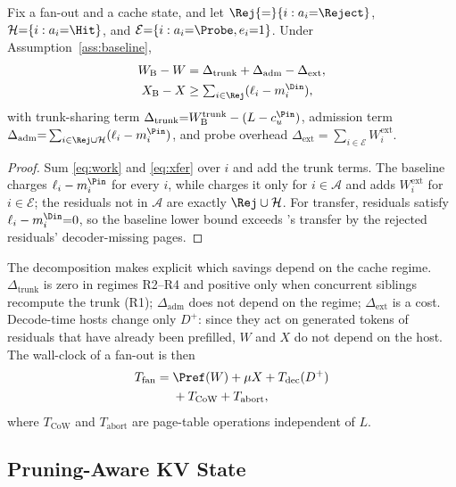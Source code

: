 \begin{proposition}[Accounting]
\label{prop:acct}
Fix a fan-out and a cache state, and let $\Rej{=}\{i:a_i{=}\Reject\}$, $\mathcal{H}{=}\{i:a_i{=}\Hit\}$, and $\mathcal{E}{=}\{i:a_i{=}\Probe,e_i{=}1\}$.
Under Assumption~\ref{ass:baseline},
\begin{align}
W_{\mathrm{B}}-W &= \Delta_{\mathrm{trunk}}+\Delta_{\mathrm{adm}}-\Delta_{\mathrm{ext}}, \label{eq:acct}\\
X_{\mathrm{B}}-X &\ge \textstyle\sum_{i\in\Rej}(\ell_i-m_i^{\Din}), \nonumber
\end{align}
with trunk-sharing term $\Delta_{\mathrm{trunk}}{=}W_{\mathrm{B}}^{\mathrm{trunk}}-(L-c_u^{\Pin})$, admission term $\Delta_{\mathrm{adm}}{=}\sum_{i\in\Rej\cup\mathcal{H}}(\ell_i-m_i^{\Pin})$, and probe overhead $\Delta_{\mathrm{ext}}{=}\sum_{i\in\mathcal{E}}W_i^{\mathrm{ext}}$.
\end{proposition}

\begin{proof}
Sum \eqref{eq:work} and \eqref{eq:xfer} over $i$ and add the trunk terms.
The baseline charges $\ell_i-m_i^{\Pin}$ for every $i$, while \sys charges it only for $i\in\mathcal{A}$ and adds $W_i^{\mathrm{ext}}$ for $i\in\mathcal{E}$; the residuals not in $\mathcal{A}$ are exactly $\Rej\cup\mathcal{H}$.
For transfer, \Hit residuals satisfy $\ell_i-m_i^{\Din}{=}0$, so the baseline lower bound exceeds \sys's transfer by the rejected residuals' decoder-missing pages.
\end{proof}

The decomposition makes explicit which savings depend on the cache regime.
$\Delta_{\mathrm{trunk}}$ is zero in regimes R2--R4 and positive only when concurrent siblings recompute the trunk (R1); $\Delta_{\mathrm{adm}}$ does not depend on the regime; $\Delta_{\mathrm{ext}}$ is a cost.
Decode-time hosts change only $D^{+}$: since they act on generated tokens of residuals that have already been prefilled, $W$ and $X$ do not depend on the host.
The wall-clock of a fan-out is then
\begin{equation}
\label{eq:tfan}
\begin{aligned}
T_{\mathrm{fan}}={}&\Pref(W)+\mu X+T_{\mathrm{dec}}(D^{+})\\
&+T_{\mathrm{CoW}}+T_{\mathrm{abort}},
\end{aligned}
\end{equation}
where $T_{\mathrm{CoW}}$ and $T_{\mathrm{abort}}$ are page-table operations independent of $L$.

\subsection{Pruning-Aware KV State}
\label{sec:kvstate}

